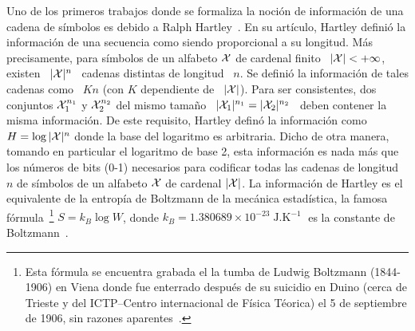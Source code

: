 \label{Sec:SZ:Entropia}


\label{Ssec:SZ:DefinicionShannon}

Uno de los primeros trabajos donde  se formaliza la noci\'on de informaci\'on de
una  cadena  de  s\'imbolos  es  debido a  Ralph  Hartley~\cite{Har28}.   En  su
art\'iculo,  Hartley defini\'o  la informaci\'on  de una  secuencia como  siendo
proporcional a su longitud.  M\'as  precisamente, para s\'imbolos de un alfabeto
$\mathcal{X}$  de cardenal  finito  \ $|\mathcal{X}|  <  +\infty$, existen  \  $|\mathcal{X}|^n$ \  cadenas
distintas de  longitud \ $n$.   Se defini\'o  la informaci\'on de  tales cadenas
como \  $K n$  (con $K$ dependiente  de \ $|\mathcal{X}|$).   Para ser  consistentes, dos
conjuntos  $\mathcal{X}_1^{n_1}$ y  $\mathcal{X}_2^{n_2}$  del mismo  tama\~no  \ $|\mathcal{X}_1|^{n_1}  =
|\mathcal{X}_2|^{n_2}$  \ deben  contener  la misma  informaci\'on.   De este  requisito,
Hartley  defin\'o la  informaci\'on como  $H =  \log |\mathcal{X}|^n$  donde la  base del
logaritmo  es  arbitraria.  Dicho  de  otra  manera,  tomando en  particular  el
logaritmo de base 2, esta informaci\'on es  nada m\'as que los n\'umeros de bits
(0-1) necesarios para codificar todas las  cadenas de longitud $n$ de s\'imbolos
de  un alfabeto  $\mathcal{X}$ de  cardenal $|\mathcal{X}|$.   La informaci\'on  de Hartley  es el
equivalente de  la entrop\'ia  de Boltzmann de  la mec\'anica  estad\'istica, la
famosa f\'ormula~\footnote{Esta  f\'ormula se encuentra  grabada el la  tumba de
Ludwig  Boltzmann (1844-1906)  en  Viena  donde fue  enterrado  despu\'es de  su
suicidio en Duino (cerca de Trieste y del ICTP--Centro internacional de F\'isica
T\'eorica)  el  5 de  septiembre  de  1906, sin  razones  aparentes~\cite{Cer08,
ArrPer13,  ArrPer15}.}   $S  =  k_B  \log  W$,  donde  $k_B  =  1.380689  \times
10^{-23}  \operatorname{J.K}^{-1}$  es  la constante  de  Boltzmann~\cite{Bol96,
Bol98, Jay65, Mer10, Mer18}.

